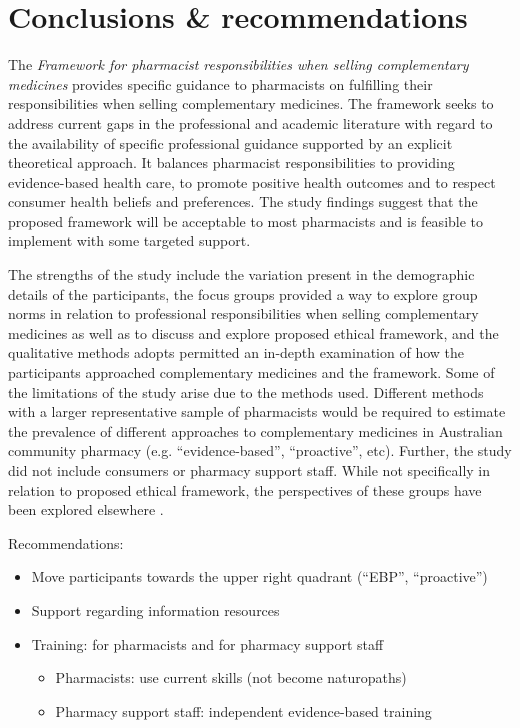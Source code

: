 \documentclass[11pt,a4paper]{article}
\providecommand{\tightlist}{%
  \setlength{\itemsep}{0pt}\setlength{\parskip}{0pt}}
\begin{document}
\section{Conclusions \&
recommendations}\label{conclusions-recommendations}

The \emph{Framework for pharmacist responsibilities when selling
complementary medicines} provides specific guidance to pharmacists on
fulfilling their responsibilities when selling complementary medicines.
The framework seeks to address current gaps in the professional and
academic literature with regard to the availability of specific
professional guidance supported by an explicit theoretical approach. It
balances pharmacist responsibilities to providing evidence-based health
care, to promote positive health outcomes and to respect consumer health
beliefs and preferences. The study findings suggest that the proposed
framework will be acceptable to most pharmacists and is feasible to
implement with some targeted support.

The strengths of the study include the variation present in the
demographic details of the participants, the focus groups provided a way
to explore group norms in relation to professional responsibilities when
selling complementary medicines as well as to discuss and explore
proposed ethical framework, and the qualitative methods adopts permitted
an in-depth examination of how the participants approached complementary
medicines and the framework. Some of the limitations of the study arise
due to the methods used. Different methods with a larger representative
sample of pharmacists would be required to estimate the prevalence of
different approaches to complementary medicines in Australian community
pharmacy (e.g. ``evidence-based'', ``proactive'', etc). Further, the
study did not include consumers or pharmacy support staff. While not
specifically in relation to proposed ethical framework, the perspectives
of these groups have been explored elsewhere \autocite{Iyer2016a}.

Recommendations:

\begin{itemize}
\tightlist
\item
  Move participants towards the upper right quadrant (``EBP'',
  ``proactive'')
\item
  Support regarding information resources
\item
  Training: for pharmacists and for pharmacy support staff

  \begin{itemize}
  \tightlist
  \item
    Pharmacists: use current skills (not become naturopaths)
  \item
    Pharmacy support staff: independent evidence-based training
  \end{itemize}
\end{itemize}

\printbibliography[title=References]
\end{document}
